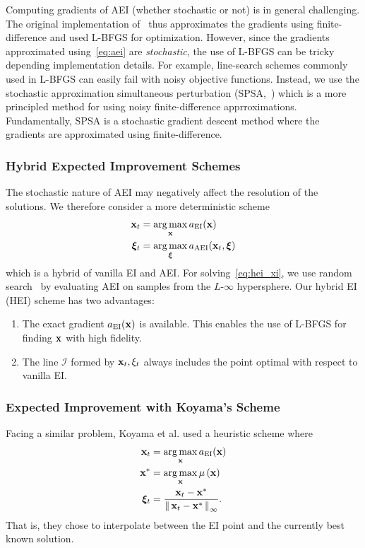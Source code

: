 Computing gradients of AEI (whether stochastic or not) is in general challenging.
The original implementation of~\cite{pmlr-v119-mikkola20a} thus approximates the gradients using finite-difference and used L-BFGS for optimization.
However, since the gradients approximated using~\cref{eq:aei} are \textit{stochastic}, the use of L-BFGS can be tricky depending implementation details.
For example, line-search schemes commonly used in L-BFGS can easily fail with noisy objective functions.
Instead, we use the stochastic approximation simultaneous perturbation (SPSA,~\cite{spall_overview_1998, spall_implementation_1998}) which is a more principled method for using noisy finite-difference apprroximations.
Fundamentally, SPSA is a stochastic gradient descent method where the gradients are approximated using finite-difference.

\subsubsection{Hybrid Expected Improvement Schemes}
The stochastic nature of AEI may negatively affect the resolution of the solutions.
We therefore consider a more deterministic scheme
\begin{align}
  \mathbf{x}_t  &= \operatorname*{arg\,max}_{\mathbf{x}}  a_{\mathrm{EI}}(\mathbf{x}) \\
  \bm{\xi}_t &= \operatorname*{arg\,max}_{\bm{\xi}} a_{\mathrm{AEI}}(\mathbf{x}_t, \bm{\xi}) \label{eq:hei_xi}
\end{align}
which is a hybrid of vanilla EI and AEI.
For solving~\cref{eq:hei_xi}, we use random search~\cite{karnopp_random_1963} by evaluating AEI on samples from the \(L\)-\(\infty\) hypersphere.
Our hybrid EI (HEI) scheme has two advantages:
\begin{enumerate}
\item The exact gradient \(a_{\mathrm{EI}}(\mathbf{x})\) is available.
  This enables the use of L-BFGS for finding \(\mathbf{x}\) with high fidelity.
\item The line \(\mathcal{I}\) formed by \(\mathbf{x}_t, \xi_t\) always includes the point optimal with respect to vanilla EI.
\end{enumerate}

\subsubsection{Expected Improvement with Koyama's Scheme}
Facing a similar problem, Koyama et al. used a heuristic scheme where
\begin{align}
  \mathbf{x}_t   &= \operatorname*{arg\,max}_{\mathbf{x}} a_{\mathrm{EI}}(\mathbf{x}) \\
  \mathbf{x}^*   &= \operatorname*{arg\,max}_{\mathbf{x}} \mu\,(\mathbf{x}) \\
  \bm{\xi}_t  &=  \frac{\mathbf{x}_t - \mathbf{x}^*}{\left\lVert\,  \mathbf{x}_t - \mathbf{x}^*  \,\right\rVert_{\infty}}.
\end{align}
That is, they chose to interpolate between the EI point and the currently best known solution.

